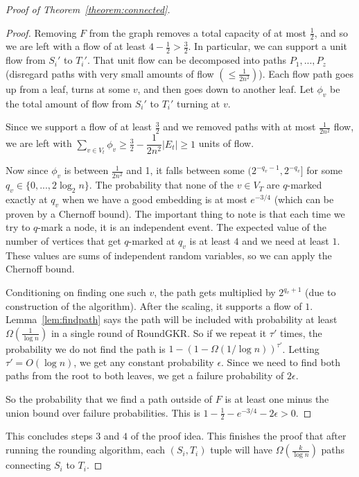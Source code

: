 \documentclass[12pt]{article}
\begin{document}
\begin{proof}[Proof of Theorem~\ref{theorem:connected}]
\begin{proof}
Removing $F$ from the graph removes a total capacity of at most $\frac{1}{2}$, and so we are left with a flow of at least $4 - \frac{1}{2} > \frac{3}{2}$. In particular, we can support a unit flow from $S_i'$ to $T_i'$. That unit flow can be decomposed into paths $P_1, ..., P_z$ (disregard paths with very small amounts of flow $(\leq \frac{1}{2n^2})$). Each flow path goes up from a leaf, turns at some $v$, and then goes down to another leaf. Let $\phi_v$ be the total amount of flow from $S_i'$ to $T_i'$ turning at $v$. 

Since we support a flow of at least $\frac{3}{2}$ and we removed paths with at most $\frac{1}{2n^2}$ flow, we are left with $\sum_{v \in V_t} \phi_v \geq \frac{3}{2} - \dfrac{1}{2n^2}|E_t| \geq 1$ units of flow. 

Now since $\phi_v$ is between $\frac{1}{2n^2}$ and 1, it falls between some $(2^{-q_v-1}, 2^{-q_v}]$ for some $q_v \in \{0, ..., 2\log_2 n\}$. The probability that none of the $v \in V_T$ are $q$-marked exactly at $q_v$ when we have a good embedding is at most $e^{-3/4}$ (which can be proven by a Chernoff bound). The important thing to note is that each time we try to $q$-mark a node, it is an independent event. The expected value of the number of vertices that get $q$-marked at $q_v$ is at least $4$ and we need at least $1$. These values are sums of independent random variables, so we can apply the Chernoff bound.

Conditioning on finding one such $v$, the path gets multiplied by $2^{q_v+1}$ (due to construction of the algorithm). After the scaling, it supports a flow of $1$. Lemma~\ref{lem:findpath} says the path will be included with probability at least $\Omega(\frac{1}{\log n})$ in a single round of RoundGKR. So if we repeat it $\tau'$ times, the probability we do not find the path is $1 - (1 - \Omega(1/\log n))^{\tau'}$. Letting $\tau' = O(\log n)$, we get any constant probability $\epsilon$. Since we need to find both paths from the root to both leaves, we get a failure probability of $2\epsilon$.

So the probability that we find a path outside of $F$ is at least one minus the union bound over failure probabilities. This is $1 - \frac{1}{2} - e^{-3/4} - 2\epsilon > 0$. 
\end{proof}

This concludes steps $3$ and $4$ of the proof idea. This finishes the proof that after running the rounding algorithm, each $(S_i, T_i)$ tuple will have $\Omega(\frac{k}{\log n})$ paths connecting $S_i$ to $T_i$. 

\end{proof}
\end{document}
